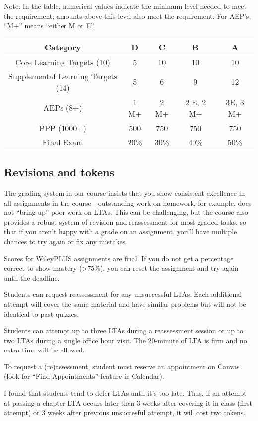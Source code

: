 Note: In the table, numerical values indicate the minimum level needed
to meet the requirement; amounts above this level also meet the
requirement. For AEP's, ``M+'' means ``either M or E''.

\begin{longtable}[]{@{}ccccc@{}}
\toprule
Category & D & C & B & A\tabularnewline
\midrule
\endhead
Core Learning Targets (10) & 5 & 10 & 10 & 10\tabularnewline
Supplemental Learning Targets (14) & 5 & 6 & 9 & 12\tabularnewline
AEPs (8+) & 1 M+ & 2 M+ & 2 E, 2 M+ & 3E, 3 M+\tabularnewline
PPP (1000+) & 500 & 750 & 750 & 750\tabularnewline
Final Exam & 20\% & 30\% & 40\% & 50\%\tabularnewline
\bottomrule
\end{longtable}

\hypertarget{revisions}{%
\subsection{Revisions and tokens}\label{revisions}}

The grading system in our course insists that you show consistent
excellence in all assignments in the course---outstanding work on
homework, for example, does not ``bring up'' poor work on LTAs. This can
be challenging, but the course also provides a robust system of revision
and reassessment for most graded tasks, so that if you aren't happy with
a grade on an assignment, you'll have multiple chances to try again or
fix any mistakes.

Scores for WileyPLUS assignments are final. If you do not get a
percentage correct to show mastery (\textgreater75\%), you can reset the
assignment and try again until the deadline.

Students can request reassessment for any unsuccessful LTAs. Each
additional attempt will cover the same material and have similar
problems but will not be identical to past quizzes.

Students can attempt up to three LTAs during a reassessment session or
up to two LTAs during a single office hour visit. The 20-minute of LTA
is firm and no extra time will be allowed.

To request a (re)assessment, student must reserve an appointment on
Canvas (look for ``Find Appointments'' feature in Calendar).

I found that students tend to defer LTAs until it's too late. Thus, if
an attempt at passing a chapter LTA occurs later then 3 weeks after
covering it in class (first attempt) or 3 weeks after previous
unsuccesful attempt, it will cost two
\protect\hyperlink{tokens}{tokens}.

